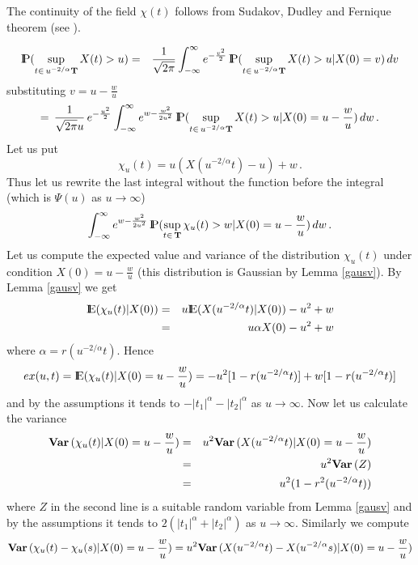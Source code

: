 \begin{remark}
The continuity of the field $\chi(t)$ follows from Sudakov, Dudley and Fernique theorem (see \cite{pit:96}).
\end{remark}
\proof
\begin{eqnarray*}
{\rm I\hspace{-0.8mm}P}(\sup_{t\in\, u^{-2/\alpha}{\bf T}}X(t)>u) &=&\frac{1}{\sqrt{2\pi}}\int_{-\infty}^{\infty}
e^{-\frac{v^2}{2}}\,{\rm I\hspace{-0.8mm}P}(\sup_{t\in\, u^{-2/\alpha}{\bf T}}X(t)>u|X(0)=v)\,dv
\end{eqnarray*}
substituting $v=u-\frac{w}{u}$ 
$$
=\,\frac{1}{\sqrt{2\pi}u}\,e^{-\frac{u^2}{2}}\int_{-\infty}^\infty e^{w-\frac{w^2}{2u^2}}\,{\rm I\hspace{-0.8mm}P}(\sup_{t\in\, u^{-2/\alpha}{\bf T}}X(t)>u|X(0)=u-\frac{w}{u})\,dw\,.
$$
Let us put 
$$
\chi_u(t)=u(X(u^{-2/\alpha}t)-u)+w\,.
$$
Thus let us rewrite the last integral without the function before the integral (which is $\Psi(u)$ as
$u\rightarrow\infty$)
\begin{equation}\label{meq1}
\int_{-\infty}^\infty e^{w-\frac{w^2}{2u^2}}\,{\rm I\hspace{-0.8mm}P}(\sup_{t\in\, {\bf T}}\chi_u (t)>w|X(0)=u-\frac{w}{u})\,dw\,.
\end{equation}
Let us compute the expected value and variance of the distribution $\chi_u(t)$ under condition $X(0)=u-\frac{w}{u}$
(this distribution is Gaussian by Lemma \ref{gausv}). 
By Lemma \ref{gausv} we get
\begin{eqnarray*}
{\rm I\hspace{-0.8mm}E}(\chi_u(t)|X(0))&=& u{\rm I\hspace{-0.8mm}E}(X(u^{-2/\alpha}t)|X(0))-u^2+w\\
&=& u\alpha X(0)-u^2+w
\end{eqnarray*}
where $\alpha=r(u^{-2/\alpha}t)$. Hence
\begin{equation}\label{warexp}
ex(u,t)={\rm I\hspace{-0.8mm}E}(\chi_u(t)|X(0)=u-\frac{w}{u})=-u^2[1-r(u^{-2/\alpha}t)]+w[1-r(u^{-2/\alpha}t)]
\end{equation}
and by the assumptions it tends to $-|t_1|^\alpha-|t_2|^\alpha$ as $u\rightarrow\infty$.
Now let us calculate the variance
\begin{eqnarray}
{\bf Var\,}(\chi_u(t)|X(0)=u-\frac{w}{u})&=& u^2{\bf Var\,}(X(u^{-2/\alpha}t)|X(0)=u-\frac{w}{u})\nonumber\\
&=& u^2{\bf Var\,}(Z)\nonumber\\
&=& u^2(1-r^2(u^{-2/\alpha}t))\label{warvar}
\end{eqnarray}
where $Z$ in the second line is a suitable random variable from Lemma \ref{gausv} and 
by the assumptions it tends to $2(|t_1|^\alpha+|t_2|^\alpha)$ as $u\rightarrow\infty$.
Similarly we compute  
$$
{\bf Var\,}(\chi_u(t)-\chi_u(s)|X(0)=u-\frac{w}{u})= u^2{\bf Var\,}(X(u^{-2/\alpha}t)-X(u^{-2/\alpha}s)|X(0)=u-\frac{w}{u})
$$
